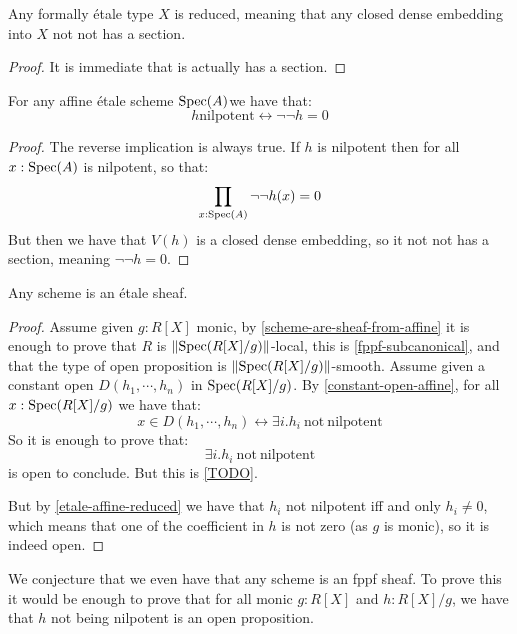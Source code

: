 \begin{lemma}
Any formally étale type $X$ is reduced, meaning that any closed dense embedding into $X$ not not has a section.
\end{lemma}

\begin{proof}
It is immediate that is actually has a section.
\end{proof}

\begin{corollary}\label{etale-affine-reduced}
For any affine étale scheme $\operatorname{Spec}(A)$we have that:
\[h \mathrm{nilpotent} \leftrightarrow \neg\neg h=0\]
\end{corollary}

\begin{proof}
The reverse implication is always true. If $h$ is nilpotent then for all $x:\operatorname{Spec}(A)$ is nilpotent, so that:
\[\prod_{x:\operatorname{Spec}(A)} \neg\neg h(x)=0\]
But then we have that $V(h)$ is a closed dense embedding, so it not not has a section, meaning $\neg\neg h = 0$.
\end{proof}

\begin{proposition}\label{schemes-are-etale-sheaves}
Any scheme is an étale sheaf.
\end{proposition}

\begin{proof}
Assume given $g:R[X]$ monic, by \cref{scheme-are-sheaf-from-affine} it is enough to prove that $R$ is $\lVert \operatorname{Spec}(R[X]/g) \rVert$-local, this is \cref{fppf-subcanonical}, and that the type of open proposition is $\lVert \operatorname{Spec}(R[X]/g) \rVert$-smooth. Assume given a constant open $D(h_1,\cdots,h_n)$ in $\operatorname{Spec}(R[X]/g)$. By \cref{constant-open-affine}, for all $x:\operatorname{Spec}(R[X]/g)$ we have that:
\[x\in D(h_1,\cdots,h_n) \leftrightarrow \exists i. h_i\ \mathrm{not\ nilpotent}\] 
So it is enough to prove that:
\[\exists i. h_i\ \mathrm{not\ nilpotent}\] 
is open to conclude. But this is \cref{TODO}.

But by \cref{etale-affine-reduced} we have that $h_i$ not nilpotent iff and only $h_i\not=0$, which means that one of the coefficient in $h$ is not zero (as $g$ is monic), so it is indeed open.
\end{proof}

\begin{remark}
We conjecture that we even have that any scheme is an fppf sheaf. To prove this it would be enough to prove that for all monic $g:R[X]$ and $h:R[X]/g$, we have that $h$ not being nilpotent is an open proposition.
\end{remark}

